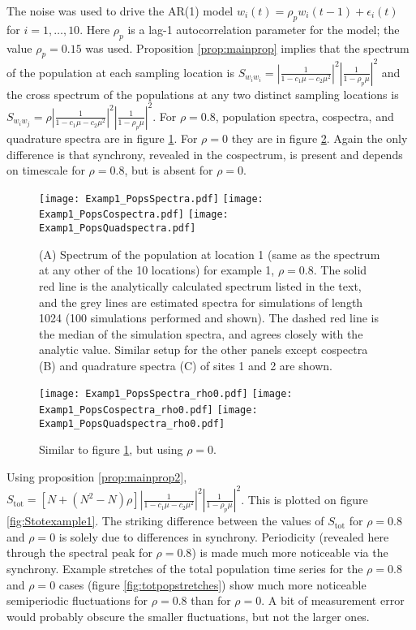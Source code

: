 \documentclass[letterpaper,11pt]{article}
\begin{document}
The noise was used to drive the AR(1) model $w_i(t)=\rho_p w_i(t-1)+\epsilon_i(t)$
for $i=1,\ldots,10$. Here $\rho_p$ is a lag-1 autocorrelation parameter for the model;
the value $\rho_p=0.15$ was used. Proposition \ref{prop:mainprop} implies
that the spectrum of the population at each sampling location is
$S_{w_i w_i} = \left| \frac{1}{1-c_1 \mu -c_2 \mu^2} \right|^2
\left| \frac{1}{1-\rho_p \mu} \right|^2$ and the cross spectrum of the populations
at any two distinct sampling locations is 
$S_{w_i w_j} = \rho \left| \frac{1}{1-c_1 \mu -c_2 \mu^2} \right|^2 
\left| \frac{1}{1-\rho_p \mu} \right|^2$.
For $\rho=0.8$,
population spectra, cospectra, and quadrature spectra are in figure \ref{fig:example1_pops_spectra_rho0p8}.
For $\rho=0$ they are in figure \ref{fig:example1_pops_spectra_rho0}.
Again the only difference is that synchrony, revealed in the cospectrum,
is present and depends on timescale for $\rho=0.8$, but is absent for 
$\rho=0$.

\begin{figure}
\texttt{[image: Examp1\_PopsSpectra.pdf]}
\texttt{[image: Examp1\_PopsCospectra.pdf]}
\texttt{[image: Examp1\_PopsQuadspectra.pdf]}
\caption{(A) Spectrum of the population at location 1 (same as the spectrum at any other of the 10 locations) for example 1, $\rho=0.8$. The solid red line is the analytically calculated spectrum listed in the text, and the grey lines are estimated spectra for simulations of length 1024 (100 simulations performed and shown). The dashed red line is the median of the simulation spectra, and agrees closely with the analytic value. Similar setup for
 the other panels except cospectra (B) and quadrature spectra (C) of sites 1 and 2 are shown. }\label{fig:example1_pops_spectra_rho0p8}
\end{figure}

\begin{figure}
\texttt{[image: Examp1\_PopsSpectra\_rho0.pdf]}
\texttt{[image: Examp1\_PopsCospectra\_rho0.pdf]}
\texttt{[image: Examp1\_PopsQuadspectra\_rho0.pdf]}
\caption{Similar to figure \ref{fig:example1_pops_spectra_rho0p8}, but using $\rho=0$.}\label{fig:example1_pops_spectra_rho0}
\end{figure}

Using proposition \ref{prop:mainprop2}, $S_{\text{tot}} = 
\left[N + (N^2-N)\rho \right] \left| \frac{1}{1-c_1 \mu - c_2 \mu^2} \right|^2  
\left| \frac{1}{1-\rho_p \mu} \right|^2$. This is plotted on figure
\ref{fig:Stotexample1}. The striking difference between the values of 
$S_{\text{tot}}$ for $\rho=0.8$ and $\rho=0$ is solely due to 
differences in synchrony. Periodicity (revealed here through the spectral peak for
$\rho=0.8$) is made much more noticeable via the synchrony. Example
stretches of the total population time series for the $\rho=0.8$ and 
$\rho=0$ cases (figure \ref{fig:totpopstretches}) show much
more noticeable semiperiodic fluctuations for $\rho=0.8$ than for 
$\rho=0$. A bit of measurement error would probably obscure the smaller fluctuations,
but not the larger ones.
\end{document}
